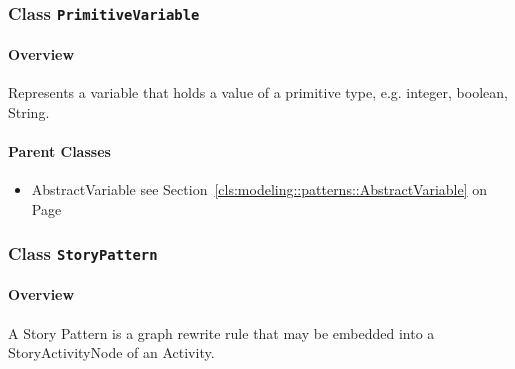 \subsubsection{\Large{Class \bfseries \texttt{PrimitiveVariable}\normalfont}}
\label{cls:modeling::patterns::PrimitiveVariable} 
\paragraph{Overview}

	
			
Represents a variable that holds a value of a primitive type, e.g. integer, boolean, String.	
		
	



\paragraph{Parent Classes}
\begin{itemize}
\item AbstractVariable see Section~\ref{cls:modeling::patterns::AbstractVariable} on Page~\pageref{cls:modeling::patterns::AbstractVariable}\end{itemize}
\subsubsection{\Large{Class \bfseries \texttt{StoryPattern}\normalfont}}
\label{cls:modeling::patterns::StoryPattern} 
\paragraph{Overview}

	
			
A Story Pattern is a graph rewrite rule that may be embedded into a StoryActivityNode
of an Activity.	
		
	


